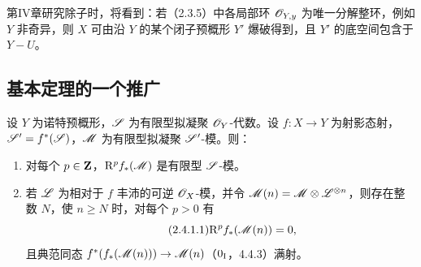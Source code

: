 第IV章研究除子时，将看到：若（2.3.5）中各局部环 $\mathscr O_{Y,y}$ 为唯一分解整环，例如 $Y$ 非奇异，则 $X$ 可由沿 $Y$ 的某个闭子预概形 $Y'$ 爆破得到，且 $Y'$ 的底空间包含于 $Y-U$。\par

\subsection{基本定理的一个推广}
设 $Y$ 为诺特预概形，$\mathscr S$ 为有限型拟凝聚 $\mathscr O_Y$-代数。设 $f:X\to Y$ 为射影态射，$\mathscr S'=f^*(\mathscr S)$，$\mathscr M$ 为有限型拟凝聚 $\mathscr S'$-模。则：
\begin{enumerate}[label=(\roman*)]
\item 对每个 $p\in\mathbf Z$，$\mathrm R^pf_*(\mathscr M)$ 是有限型 $\mathscr S$-模。
\item 若 $\mathscr L$ 为相对于 $f$ 丰沛的可逆 $\mathscr O_X$-模，并令 $\mathscr M(n)=\mathscr M\otimes\mathscr L^{\otimes n}$，则存在整数 $N$，使 $n\geq N$ 时，对每个 $p>0$ 有
\begin{equation}\tag{2.4.1.1}
\mathrm R^pf_*(\mathscr M(n))=0,
\end{equation}
且典范同态 $f^*(f_*(\mathscr M(n)))\to\mathscr M(n)$（$0_{\mathrm I}$，4.4.3）满射。
\end{enumerate}
